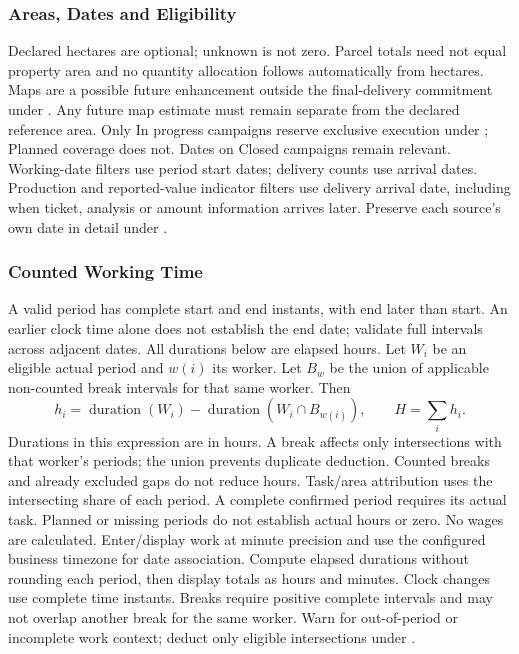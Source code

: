 \subsubsection{Areas, Dates and Eligibility}
Declared hectares are optional; unknown is not zero. Parcel totals need not equal
property area and no quantity allocation follows automatically from hectares.
Maps are a possible future enhancement outside the final-delivery commitment
under . Any future map estimate must remain separate from
the declared reference area.
Only In progress campaigns reserve exclusive execution under ;
Planned coverage does not. Dates on Closed campaigns remain
relevant. Working-date filters use period start dates; delivery counts use arrival
dates. Production and reported-value indicator filters use delivery arrival date, including when ticket, analysis or amount information arrives later. Preserve each source's own date in detail under .

\subsubsection{Counted Working Time}
\label{sec:counted-working-time}
A valid period has complete start and end instants, with end later than start.
An earlier clock time alone does not establish the end date; validate full intervals
across adjacent dates. All durations below are elapsed hours.
Let \(W_i\) be an eligible actual
period and \(w(i)\) its worker. Let \(B_w\) be the union of applicable non-counted
break intervals for that same worker. Then
\[
h_i=\operatorname{duration}(W_i)-
\operatorname{duration}(W_i\cap B_{w(i)}),\qquad H=\sum_i h_i.
\]
Durations in this expression are in hours. A break affects only intersections
with that worker's periods; the union prevents duplicate deduction. Counted
breaks and already excluded gaps do not reduce hours. Task/area attribution uses
the intersecting share of each period. A complete confirmed period requires its actual task. Planned or missing periods do not establish actual hours or zero.
No wages are calculated. Enter/display work at minute precision and use the configured business timezone for date association. Compute elapsed durations without rounding each period, then display totals as hours and minutes. Clock changes use complete time instants. Breaks require positive complete intervals and may not overlap another break for the same worker. Warn for out-of-period or incomplete work context; deduct only eligible intersections under .

